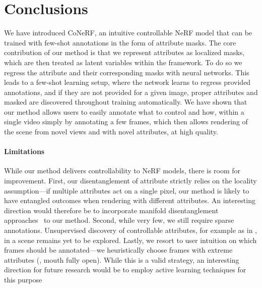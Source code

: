 \section{Conclusions}
  We have introduced CoNeRF, an intuitive controllable NeRF model that can be
  trained with few-shot annotations in the form of attribute masks.
  The core contribution of our method is that we represent attributes as
  localized masks, which are then treated as latent variables within the
  framework.
  To do so we regress the attribute and their corresponding masks with neural
  networks.
  This leads to a few-shot learning setup, where the network learns to regress
  provided annotations, and if they are not provided for a given image, proper
  attributes and masked are discovered throughout training automatically.
  We have shown that our method allows users to easily annotate what to control
  and how, within a single video simply by annotating a few frames, which then
  allows rendering of the scene from novel views and with novel attributes, at
  high quality.

  \paragraph{Limitations}
    While our method delivers controllability to NeRF models, there is room for
    improvement.
    First, our disentanglement of attribute strictly relies on the locality
    assumption---if multiple attributes act on a single pixel, our method is
    likely to have entangled outcomes when rendering with different attributes.
    An interesting direction would therefore be to incorporate manifold
    disentanglement approaches~\cite{li2020markov,zhang2021product} to our method.
    Second, while very few, we still require sparse annotations.
    Unsupervised discovery of controllable attributes, for example as in
    \cite{kulkarni2019unsupervised}, in a scene remains yet to be explored.
    Lastly, we resort to user intuition on which frames should be annotated---we
    heuristically choose frames with extreme attributes (\eg, mouth fully open).
    While this is a valid strategy, an interesting direction for future research would be to employ active learning techniques for this purpose~\cite{ren2020survey,belharbi2021deep}

    \endinput
